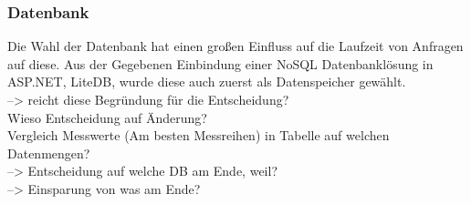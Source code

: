 \subsubsection{Datenbank} \label{sec:ExperimenteDB}
Die Wahl der Datenbank hat einen großen Einfluss auf die Laufzeit von Anfragen auf diese.
Aus der Gegebenen Einbindung einer NoSQL Datenbanklösung in ASP.NET, LiteDB, wurde diese auch zuerst als Datenspeicher gewählt.
\\
--> reicht diese Begründung für die Entscheidung? \\

Wieso Entscheidung auf Änderung? \\

Vergleich Messwerte (Am besten Messreihen) in Tabelle auf welchen Datenmengen? \\

--> Entscheidung auf welche DB am Ende, weil? \\
--> Einsparung von was am Ende? \\